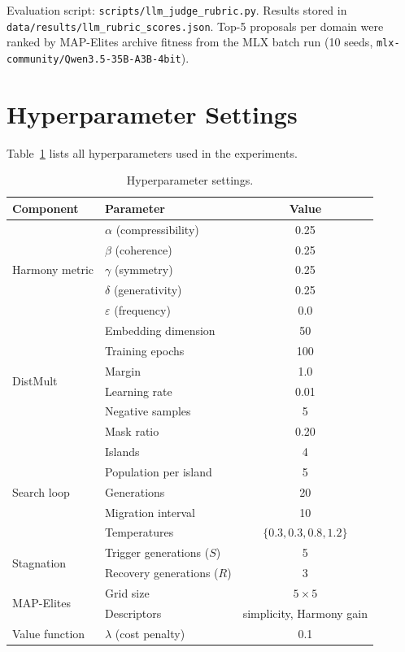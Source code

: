\noindent Evaluation script: \texttt{scripts/llm\_judge\_rubric.py}.
Results stored in \texttt{data/results/llm\_rubric\_scores.json}.
Top-5 proposals per domain were ranked by MAP-Elites archive fitness from
the MLX batch run (10 seeds, \texttt{mlx-community/Qwen3.5-35B-A3B-4bit}).

\section{Hyperparameter Settings}\label{app:hyperparams}

Table~\ref{tab:hyperparams} lists all hyperparameters used in the experiments.

\begin{table}[h]
\centering
\caption{Hyperparameter settings.}\label{tab:hyperparams}
\begin{tabular}{llc}
\toprule
Component & Parameter & Value \\
\midrule
\multirow{5}{*}{Harmony metric}
  & $\alpha$ (compressibility) & 0.25 \\
  & $\beta$ (coherence) & 0.25 \\
  & $\gamma$ (symmetry) & 0.25 \\
  & $\delta$ (generativity) & 0.25 \\
  & $\varepsilon$ (frequency) & 0.0 \\
\midrule
\multirow{6}{*}{DistMult}
  & Embedding dimension & 50 \\
  & Training epochs & 100 \\
  & Margin & 1.0 \\
  & Learning rate & 0.01 \\
  & Negative samples & 5 \\
  & Mask ratio & 0.20 \\
\midrule
\multirow{5}{*}{Search loop}
  & Islands & 4 \\
  & Population per island & 5 \\
  & Generations & 20 \\
  & Migration interval & 10 \\
  & Temperatures & $\{0.3, 0.3, 0.8, 1.2\}$ \\
\midrule
\multirow{2}{*}{Stagnation}
  & Trigger generations ($S$) & 5 \\
  & Recovery generations ($R$) & 3 \\
\midrule
\multirow{2}{*}{MAP-Elites}
  & Grid size & $5 \times 5$ \\
  & Descriptors & simplicity, Harmony gain \\
\midrule
Value function
  & $\lambda$ (cost penalty) & 0.1 \\
\bottomrule
\end{tabular}
\end{table}

